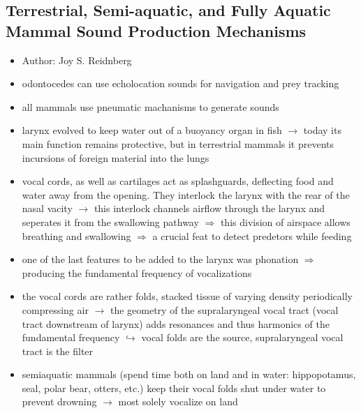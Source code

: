 \documentclass[12pt,a4paper]{article}
\begin{document}
\newpage
\subsection{Terrestrial, Semi-aquatic, and Fully Aquatic Mammal Sound Production Mechanisms} %
\label{sub:terrestrial_semiaquatic_and_fully_aquatic_mammal_sound_production_mechanisms}
\begin{itemize}
  \item Author: Joy S. Reidnberg \cite{reidenberg_terrestrial_2017}
  \item odontocedes can use echolocation sounds for navigation and prey tracking
  \item all mammals use pneumatic machanisms to generate sounds
  \item larynx evolved to keep water out of a buoyancy organ in fish
  \newline \indent $\longrightarrow$ today its main function remains protective, but in terrestrial mammals it prevents incursions of foreign material into the lungs
  \item vocal cords, as well as cartilages act as splashguards, deflecting food and water away from the opening. They interlock the larynx with the rear of the nasal vacity
  \newline \indent $\longrightarrow$ this interlock channels airflow through the larynx and seperates it from the swallowing pathway $\Longrightarrow$ this division of airspace allows breathing and swallowing $\Longrightarrow$ a crucial feat to detect predetors while feeding
  \item one of the last features to be added to the larynx was phonation $\Longrightarrow$ producing the fundamental frequency of vocalizations
  \item the vocal cords are rather folds, stacked tissue of varying density periodically compressing air
  \newline \indent $\longrightarrow$ the geometry of the supralaryngeal vocal tract (vocal tract downstream of larynx) adds resonances and thus harmonics of the fundamental frequency
  \newline \indent $\hookrightarrow$ vocal folds are the source, supralaryngeal vocal tract is the filter
  \item semiaquatic mammals (spend time both on land and in water: hippopotamus, seal, polar bear, otters, etc.) keep their vocal folds shut under water to prevent drowning
  \newline \indent $\longrightarrow$ most solely vocalize on land

\end{itemize}
\end{document}
